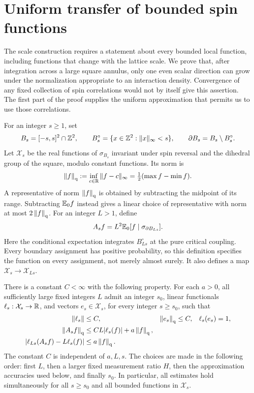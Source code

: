 \section{Uniform transfer of bounded spin functions}
\label{sec:transfer}

The scale construction requires a statement about every bounded local
function, including functions that change with the lattice scale.  We prove
that, after integration across a large square annulus, only one even scalar
direction can grow under the normalization appropriate to an interaction
density.  Convergence of any fixed collection of spin correlations would not
by itself give this assertion.  The first part of the proof supplies the
uniform approximation that permits us to use those correlations.

For an integer $s\geq1$, set
\[
 B_s=[-s,s]^2\cap\mathbb Z^2,\qquad
 B_s^\circ=\{x\in\mathbb Z^2:\|x\|_\infty<s\},\qquad
 \partial B_s=B_s\setminus B_s^\circ.
\]
Let $\mathcal X_s$ be the real functions of $\sigma_{B_s}$ invariant under
spin reversal and the dihedral group of the square, modulo constant
functions.  Its norm is
\begin{equation}
 \left\|f\right\|_{\mathrm q}:=\inf_{c\in\mathbb R}\|f-c\|_\infty
       =\tfrac12(\max f-\min f).
 \label{eq:transfer-quotient}
\end{equation}
A representative of norm $\left\|f\right\|_{\mathrm q}$ is obtained by subtracting the midpoint
of its range.  Subtracting $\mathbb E_0f$ instead gives a linear choice of
representative with norm at most $2\left\|f\right\|_{\mathrm q}$.
For an integer $L>1$, define
\begin{equation}
 A_s f=L^2\mathbb E_0[f\mid\sigma_{\partial B_{Ls}}].
 \label{eq:transfer-operator}
\end{equation}
Here the conditional expectation integrates $B_{Ls}^\circ$ at the pure
critical coupling.  Every boundary assignment has positive probability,
so this definition specifies the function on every assignment, not merely
almost surely.  It also defines a map $\mathcal X_s\to\mathcal X_{Ls}$.

\begin{theorem}\label{thm:transfer}
There is a constant $C<\infty$ with the following property.  For each
$a>0$, all sufficiently large fixed integers $L$ admit an integer $s_0$,
linear functionals $\ell_s:\mathcal X_s\to\mathbb R$, and vectors
$e_s\in\mathcal X_s$, for every integer $s\geq s_0$, such that
\begin{align}
 \|\ell_s\|&\leq C,& \left\|e_s\right\|_{\mathrm q}&\leq C,& \ell_s(e_s)&=1,
 \label{eq:transfer-uniform-norms}\\
 \left\|A_sf\right\|_{\mathrm q}&\leq CL|\ell_s(f)|+a\left\|f\right\|_{\mathrm q},
 \label{eq:transfer-stable}\\
 |\ell_{Ls}(A_sf)-L\ell_s(f)|&\leq a\left\|f\right\|_{\mathrm q}.
 \label{eq:transfer-compatible}
\end{align}
The constant $C$ is independent of $a,L,s$.  The choices are made in the
following order: first $L$, then a larger fixed measurement ratio $H$, then
the approximation accuracies used below, and finally $s_0$.  In particular,
all estimates hold simultaneously for all $s\geq s_0$ and all bounded
functions in $\mathcal X_s$.
\end{theorem}

